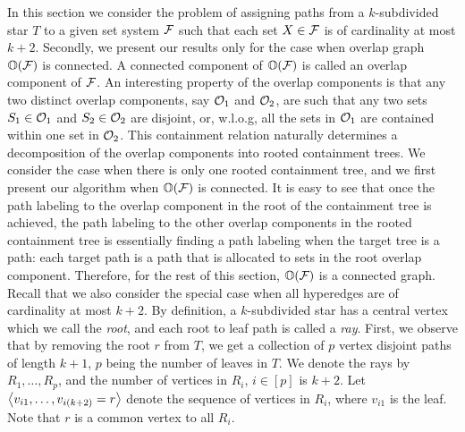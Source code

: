 
In this section we consider the problem of assigning paths from a
$k$-subdivided star $T$ to a given set system ${\cal F}$ such that each set
$X \in {\cal F}$ is of cardinality at most $k+2$.  Secondly, we present our
results only for the case when overlap graph $\mathbb O({\cal F})$ is connected.
A connected component of $\mathbb O({\cal F})$ is called an overlap component of
${\cal F}$.  An interesting property of the overlap components is that any
two distinct overlap components, say ${\cal O}_1$ and ${\cal O}_2$, are such
that any two sets $S_1 \in {\cal O}_1$ and $S_2 \in {\cal O}_2$ are disjoint,
or, w.l.o.g, all the sets in ${\cal O}_1$ are contained within one set in
${\cal O}_2$.  This containment relation naturally determines a
decomposition of the overlap components into rooted containment trees.
We consider the case when there is only one rooted containment tree,
and we first present our algorithm when $\mathbb O({\cal F})$ is connected.  It
is easy to see that once the path labeling to the overlap component in
the root of the containment tree is achieved, the path labeling to the
other overlap components in the rooted containment tree is essentially
finding a path labeling when the target tree is a path: each target
path is a path that is allocated to sets in the root overlap
component.  Therefore, for the rest of this section, $\mathbb O({\cal F})$ is a
connected graph. Recall that we also consider the special case when
all hyperedges are of cardinality at most $k+2$.  By definition, a
$k$-subdivided star has a central vertex which we call the {\em root},
and each root to leaf path is called a {\em ray}.  First, we observe
that by removing the root $r$ from $T$, we get a collection of $p$
vertex disjoint paths of length $k+1$, $p$ being the number of leaves
in $T$.  We denote the rays by $R_1, \ldots, R_p$, and the number of
vertices in $R_i$, $i \in [p]$ is $k+2$.  Let
$\left\langle v_{i1},\ldots,v_{i(k+2)}=r \right\rangle$ denote the sequence of vertices in
$R_i$, where $v_{i1}$ is the leaf. Note that $r$ is a common vertex to
all $R_i$.
  


